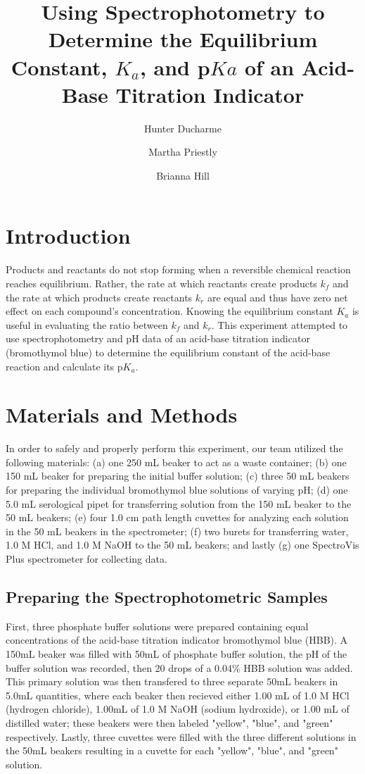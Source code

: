 \documentclass[10pt]{article} %
\title{\Large \vspace{-3.5cm} Using Spectrophotometry to Determine the Equilibrium Constant, $K_a$, and p$Ka$ of an Acid-Base Titration Indicator}
\author[*]{Hunter Ducharme}
\author[**]{Martha Priestly}
\author[**]{Brianna Hill}
\affil[*]{Primary author}
\affil[**]{Lab partners}
\date{} %
\begin{document}
\maketitle
\section{Introduction}

Products and reactants do not stop forming when a reversible chemical reaction reaches equilibrium. Rather, the rate at which reactants create products $k_f$ and the rate at which products create reactants $k_r$ are equal and thus have zero net effect on each compound's concentration. Knowing the equilibrium constant $K_a$ is useful in evaluating the ratio between $k_f$ and $k_r$. This experiment attempted to use spectrophotometry and pH data of an acid-base titration indicator (bromothymol blue) to determine the equilibrium constant of the acid-base reaction and calculate its p$K_a$.

\section{Materials and Methods}

In order to safely and properly perform this experiment, our team utilized the following materials: (a) one 250 mL beaker to act as a waste container; (b) one 150 mL beaker for preparing the initial buffer solution; (c) three 50 mL beakers for preparing the individual bromothymol blue solutions of varying pH; (d) one 5.0 mL serological pipet for transferring solution from the 150 mL beaker to the 50 mL beakers; (e) four 1.0 cm path length cuvettes for analyzing each solution in the 50 mL beakers in the spectrometer; (f) two burets for transferring water, 1.0 M HCl, and 1.0 M NaOH to the 50 mL beakers; and lastly (g) one SpectroVis Plus spectrometer for collecting data.

\subsection{Preparing the Spectrophotometric Samples}
First, three phosphate buffer solutions were prepared containing equal concentrations of the acid-base titration indicator bromothymol blue (HBB). A 150mL beaker was filled with 50mL of phosphate buffer solution, the pH of the buffer solution was recorded, then 20 drops of a 0.04\% HBB solution was added. This primary solution was then transfered to three separate 50mL beakers in 5.0mL quantities, where each beaker then recieved either 1.00 mL of 1.0 M HCl (hydrogen chloride), 1.00mL of 1.0 M NaOH (sodium hydroxide), or 1.00 mL of distilled water; these beakers were then labeled "yellow", "blue", and "green" respectively. Lastly, three cuvettes were filled with the three different solutions in the 50mL beakers resulting in a cuvette for each "yellow", "blue", and "green" solution.
\end{document}
